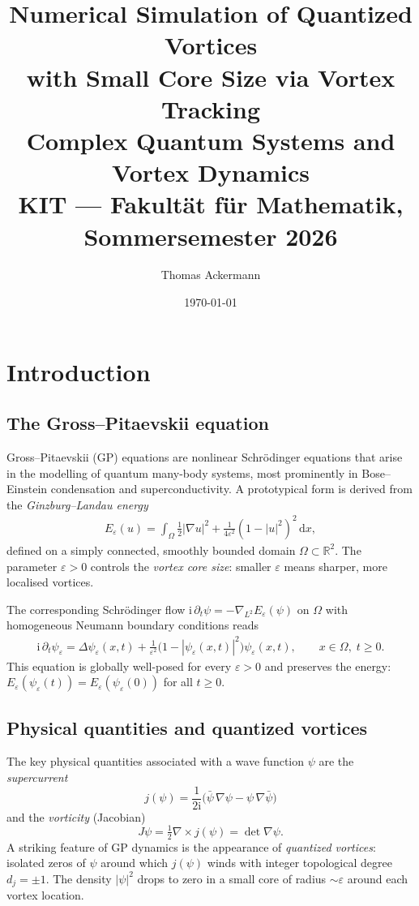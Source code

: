 \documentclass[12pt, a4paper]{article}
\title{
  \Large\textbf{Numerical Simulation of Quantized Vortices\\
  with Small Core Size via Vortex Tracking}\\[0.5em]
  \large Complex Quantum Systems and Vortex Dynamics\\
  KIT --- Fakult\"{a}t f\"{u}r Mathematik, Sommersemester 2026
}
\author{Thomas Ackermann}
\date{\today}
\theoremstyle{plain}
\theoremstyle{definition}
\newcommand{\R}{\mathbb{R}}
\newcommand{\psieps}{\psi_\varepsilon}
\newcommand{\dd}{\,\mathrm{d}}
\newcommand{\abs}[1]{\left\lvert #1 \right\rvert}
\begin{document}
\maketitle
\thispagestyle{empty}

\section{Introduction}

\subsection{The Gross--Pitaevskii equation}

Gross--Pitaevskii (GP) equations are nonlinear Schr\"{o}dinger equations
that arise in the modelling of quantum many-body systems, most prominently
in Bose--Einstein condensation and superconductivity.
A prototypical form is derived from the \emph{Ginzburg--Landau energy}
\begin{align}
    E_\varepsilon(u)
    = \int_\Omega \frac{1}{2}\abs{\nabla u}^2
      + \frac{1}{4\varepsilon^2}(1 - \abs{u}^2)^2 \dd x,
    \label{eq:GL-energy}
\end{align}
defined on a simply connected, smoothly bounded domain $\Omega \subset \R^2$.
The parameter $\varepsilon > 0$ controls the \emph{vortex core size}:
smaller $\varepsilon$ means sharper, more localised vortices.

The corresponding Schr\"{o}dinger flow
$\mathrm{i}\,\partial_t\psi = -\nabla_{L^2} E_\varepsilon(\psi)$
on $\Omega$ with homogeneous Neumann boundary conditions reads
\begin{align}
  \mathrm{i}\,\partial_t \psieps
  = \Delta \psieps(x,t)
    + \frac{1}{\varepsilon^2}\bigl(1 - \abs{\psieps(x,t)}^2\bigr)\psieps(x,t),
  \qquad x \in \Omega,\; t \geq 0.
  \label{eq:GP}
\end{align}
This equation is globally well-posed for every $\varepsilon > 0$ and
preserves the energy: $E_\varepsilon(\psieps(t)) = E_\varepsilon(\psieps(0))$ for all $t \geq 0$.

\subsection{Physical quantities and quantized vortices}

The key physical quantities associated with a wave function $\psi$ are the
\emph{supercurrent}
\[
  j(\psi) = \frac{1}{2\mathrm{i}}\bigl(\bar\psi\,\nabla\psi - \psi\,\nabla\bar\psi\bigr)
\]
and the \emph{vorticity} (Jacobian)
\[
  J\psi = \tfrac{1}{2}\nabla \times j(\psi) = \det \nabla\psi.
\]
A striking feature of GP dynamics is the appearance of
\emph{quantized vortices}: isolated zeros of $\psi$ around which
$j(\psi)$ winds with integer topological degree $d_j = \pm 1$.
The density $\abs{\psi}^2$ drops to zero in a small core of radius $\sim\varepsilon$
around each vortex location.
\end{document}
